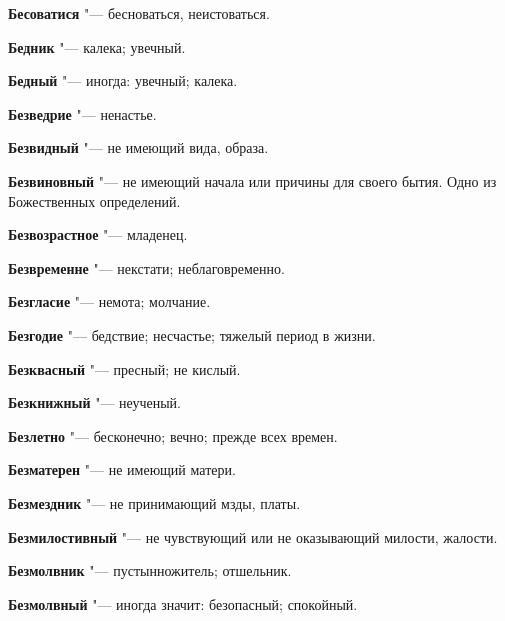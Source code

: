 \begin{mymulticols}{2}
\noindent\textbf{Бесоватися} "--- бесноваться, неистоваться. 




\noindent\textbf{Бедник} "--- калека; увечный. 




\noindent\textbf{Бедный} "--- иногда: увечный; калека. 




\noindent\textbf{Безведрие} "--- ненастье. 




\noindent\textbf{Безвидный} "--- не имеющий вида, образа. 




\noindent\textbf{Безвиновный} "--- не имеющий начала или причины для своего бытия. Одно из Божественных определений. 




\noindent\textbf{Безвозрастное} "--- младенец. 




\noindent\textbf{Безвременне} "--- некстати; неблаговременно. 




\noindent\textbf{Безгласие} "--- немота; молчание. 




\noindent\textbf{Безгодие} "--- бедствие; несчастье; тяжелый период в жизни. 




\noindent\textbf{Безквасный} "--- пресный; не кислый. 




\noindent\textbf{Безкнижный} "--- неученый. 




\noindent\textbf{Безлетно} "--- бесконечно; вечно; прежде всех времен. 




\noindent\textbf{Безматерен} "--- не имеющий матери. 




\noindent\textbf{Безмездник} "--- не принимающий мзды, платы. 




\noindent\textbf{Безмилостивный} "--- не чувствующий или не оказывающий милости, жалости. 




\noindent\textbf{Безмолвник} "--- пустынножитель; отшельник. 




\noindent\textbf{Безмолвный} "--- иногда значит: безопасный; спокойный. 





\end{mymulticols}

